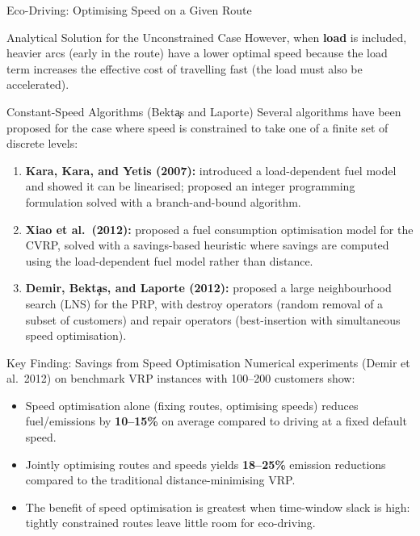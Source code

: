 \documentclass[aspectratio=169,10pt]{beamer}
\begin{document}
\begin{frame}[allowframebreaks]{Eco-Driving: Optimising Speed on a Given Route}
\begin{block}{Analytical Solution for the Unconstrained Case}
    However, when \textbf{load} is included, heavier arcs (early in the route)
    have a lower optimal speed because the load term increases the effective
    cost of travelling fast (the load must also be accelerated).
  \end{block}

  \framebreak

  \begin{block}{Constant-Speed Algorithms (Bekt\c{a}s and Laporte)}
    Several algorithms have been proposed for the case where speed is
    constrained to take one of a finite set of discrete levels:
    \begin{enumerate}
      \item \textbf{Kara, Kara, and Yetis (2007):} introduced a load-dependent
      fuel model and showed it can be linearised; proposed an integer
      programming formulation solved with a branch-and-bound algorithm.
      \item \textbf{Xiao et al.\ (2012):} proposed a fuel consumption
      optimisation model for the CVRP, solved with a savings-based
      heuristic where savings are computed using the load-dependent fuel
      model rather than distance.
      \item \textbf{Demir, Bekt\c{a}s, and Laporte (2012):} proposed a large
      neighbourhood search (LNS) for the PRP, with destroy operators
      (random removal of a subset of customers) and repair operators
      (best-insertion with simultaneous speed optimisation).
    \end{enumerate}
  \end{block}

  \framebreak

  \begin{alertblock}{Key Finding: Savings from Speed Optimisation}
    Numerical experiments (Demir et al.\ 2012) on benchmark VRP instances
    with 100--200 customers show:
    \begin{itemize}
      \item Speed optimisation alone (fixing routes, optimising speeds)
      reduces fuel/emissions by \textbf{10--15\%} on average compared to
      driving at a fixed default speed.
      \item Jointly optimising routes and speeds yields \textbf{18--25\%}
      emission reductions compared to the traditional distance-minimising VRP.
      \item The benefit of speed optimisation is greatest when time-window
      slack is high: tightly constrained routes leave little room for
      eco-driving.
    \end{itemize}
  \end{alertblock}

\end{frame}
\end{document}
